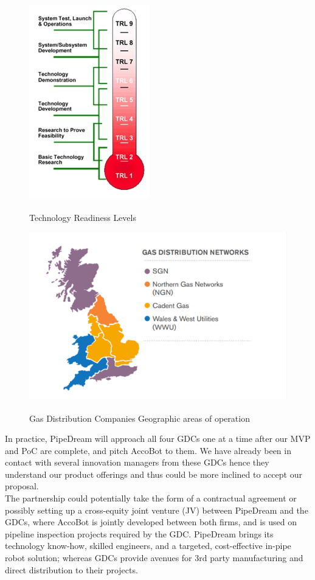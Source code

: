 \documentclass[11pt]{article}		%
\newlength{\imageheight}	 %
\newcommand{\supercite}[1]{\textsuperscript{\cite{#1}}}		%
\begin{document}
	\begin{figure}[h]
					\centering
					\begin{multicols}{2}
						\includegraphics[height=\imageheight]{TRL.jpg}
						\caption{Technology Readiness Levels\supercite{sönnichsen_5_2021}}
						\label{techReadyLevels}
						\columnbreak
						\includegraphics[height=\imageheight]{distribution.pdf}
						\caption{Gas Distribution Companies Geographic areas of operation\supercite{sönnichsen_5_2021}}
						\label{distrit2}
					\end{multicols}
				\end{figure}
		\vspace{-0.5cm}
	In practice, PipeDream will approach all four GDCs one at a time after our MVP and PoC are complete, and pitch AccoBot to them. We have already been in contact with several innovation managers from these GDCs hence they understand our product offerings and thus could be more inclined to accept our proposal. 
    \\ \hspace*{3ex}The partnership could potentially take the form of a contractual agreement or possibly setting up a cross-equity joint venture (JV) between PipeDream and the GDCs, where AccoBot is jointly developed between both firms, and is used on pipeline inspection projects required by the GDC. PipeDream brings its technology know-how, skilled engineers, and a targeted, cost-effective in-pipe robot solution; whereas GDCs provide avenues for 3rd party manufacturing and direct distribution to their projects. 
\end{document}
